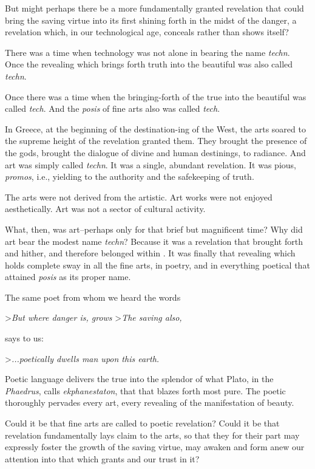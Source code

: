 \documentclass[12pt]{article}
\begin{document}
But might perhaps there be a more fundamentally granted revelation that could bring the saving virtue into its first shining forth in the midst of the danger, a revelation which, in our technological age, conceals rather than shows itself?

There was a time when technology was not alone in bearing the name \textit{techn}. Once the revealing which brings forth truth into the beautiful was also called \textit{techn}.

Once there was a time when the bringing-forth of the true into the beautiful was called \textit{tech}. And the \textit{posis} of fine arts also was called \textit{tech}.

In Greece, at the beginning of the destination-ing of the West, the arts soared to the supreme height of the revelation granted them. They brought the presence of the gods, brought the dialogue of divine and human destinings, to radiance. And art was simply called \textit{techn}. It was a single, abundant revelation. It was pious, \textit{promos}, i.e., yielding to the authority and the safekeeping of truth.

The arts were not derived from the artistic. Art works were not enjoyed aesthetically. Art was not a sector of cultural activity.

What, then, was art--perhaps only for that brief but magnificent time? Why did art bear the modest name \textit{techn}? Because it was a revelation that brought forth and hither, and therefore belonged within . It was finally that revealing which holds complete sway in all the fine arts, in poetry, and in everything poetical that attained \textit{posis} as its proper name.

The same poet from whom we heard the words

>\textit{But where danger is, grows}
>\textit{The saving also,}

says to us:

>\textit{...poetically dwells man upon this earth.}

Poetic language delivers the true into the splendor of what Plato, in the \textit{Phaedrus}, calls \textit{ekphanestaton}, that that blazes forth most pure. The poetic thoroughly pervades every art, every revealing of the manifestation of beauty.

Could it be that fine arts are called to poetic revelation? Could it be that revelation fundamentally lays claim to the arts, so that they for their part may expressly foster the growth of the saving virtue, may awaken and form anew our attention into that which grants and our trust in it?
\end{document}
